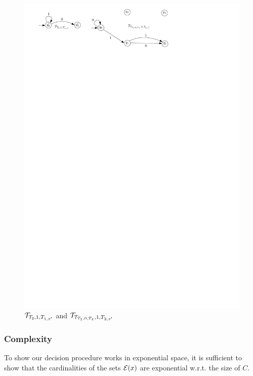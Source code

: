 \begin{example}
\begin{figure}[htbp]
\begin{center}
\includegraphics[scale=0.7]{single-letter-example-nested-2.pdf}
\end{center}
\caption{$\mathcal{T}_{\mathcal{T}_2, 1, T_{1,z'}}$ and $\mathcal{T}_{\mathcal{T}_{\mathcal{T}_1, 0, T_z}, 1, T_{2,z'}}$}\label{fig-sl-exmp-nested-2}
\end{figure}
\end{example}


\subsubsection{Complexity}

To show our decision procedure works in exponential space, it is sufficient to show that the cardinalities of the sets $\mathcal{E}(x)$ are exponential w.r.t. the size of $C$.


